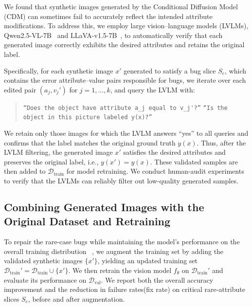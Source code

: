 \documentclass[10pt]{article} %
\newcommand{\qwen}{Qwen2.5-VL\xspace}
\newcommand{\llava}{LLaVA-v1.5\xspace}
\begin{document}
We found that synthetic images generated by the Conditional Diffusion Model (CDM) can sometimes fail to accurately reflect the intended attribute modifications. To address this, we employ large vision--language models (LVLMs), \qwen{}-7B~\citep{bai2025qwen25vl} and \llava{}-7B~\citep{liu2023improvedllava}, to automatically verify that each generated image correctly exhibits the desired attributes and retains the original label.

Specifically, for each synthetic image \(x'\) generated to satisfy a bug slice \(S_e\), which contains the error attribute–value pairs responsible for bugs, we iterate over each edited pair \((a_j, v_j')\) for \(j = 1, \dots, k\), and query the LVLM with: 
\vspace{-3pt}
\begin{quote}
\centering
\setlength{\parskip}{0pt}
\setlength{\parsep}{0pt}
\texttt{``Does the object have attribute \(a_j\) equal to \(v_j'\)?''} \newline
\texttt{``Is the object in this picture labeled \(y(x)\)?''}
\end{quote}
\vspace{-5pt}

We retain only those images for which the LVLM answers “yes” to all queries and confirms that the label matches the original ground truth \(y(x)\). Thus, after the LVLM filtering, the generated image \(x'\) satisfies the desired attributes and preserves the original label, i.e., \(y(x') = y(x)\). These validated samples are then added to \(\mathcal{D}_{\mathrm{train}}\) for model retraining. We conduct human-audit experiments to verify that the LVLMs can reliably filter out low-quality generated samples.



\subsection{Combining Generated Images with the Original Dataset and Retraining}
To repair the rare-case bugs while maintaining the model's performance on the overall training distribution ~\citep{lee2024genmix}, we augment the training set by adding the validated synthetic images \(\{x'\}\), yielding an updated training set 
$
\mathcal{D}_{\mathrm{train}}' = \mathcal{D}_{\mathrm{train}} \cup \{x'\}.
$
We then retrain the vision model \(f_\theta\) on \(\mathcal{D}_{\mathrm{train}}'\) and evaluate its performance on \(\mathcal{D}_{\mathrm{val}}\). We report both the overall accuracy improvement and the reduction in failure rates(fix rate) on critical rare‐attribute slices \(S_e\), before and after augmentation.
\end{document}
